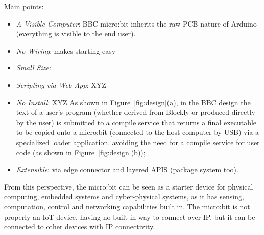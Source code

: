 Main points:
\begin{itemize}
\item {\em A Visible Computer}: BBC micro:bit inherits the raw PCB nature of Arduino  (everything is visible to the end user).
\item {\em No Wiring}: makes starting easy
\item {\em Small Size}: 
\item {\em Scripting via Web App}: XYZ
\item {\em No Install}: XYZ
As shown in Figure~\ref{fig:design}(a), in the BBC design
the text of a user's program (whether derived from Blockly or produced directly by the user)
is submitted to a compile service that returns a final executable to be copied onto a micro:bit (connected to the host 
computer by USB) via a specialized loader application.  
avoiding the need for a compile service for user code (as shown 
in Figure~\ref{fig:design}(b));
\item {\em Extensible}: via edge connector and layered APIS (package system too).
\end{itemize}
From this perspective, the micro:bit can be seen as a starter device
for physical computing, embedded systems and cyber-physical systems, as it has
sensing, computation, control and networking capabilities built in.  The
micro:bit is not properly an IoT device, having no built-in way to connect
over IP, but it can be connected to other devices with IP connectivity. 


 




